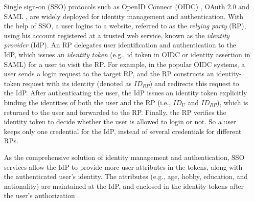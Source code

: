 Single sign-on (SSO) protocols such as OpenID Connect (OIDC) \cite{OpenIDConnect}, OAuth 2.0 \cite{rfc6749} and SAML \cite{SAML,SAMLIdentifier},
 are widely deployed for identity management and authentication.
 With the help of SSO,
  a user logins to a website, referred to as the \emph{relying party} (RP), using his account registered at a trusted web service,
   known as the \emph{identity provider} (IdP).
An RP delegates user identification and authentication to the IdP,
    which issues an \emph{identity token} (e.g., id token in OIDC or identity assertion in SAML) for a user to visit the RP. %
%
%
For example, in the popular OIDC systems,
     a user sends a login request to the target RP, %
and the RP constructs an identity-token request with its identity (denoted as $ID_{RP}$) and redirects this request to the IdP.
After authenticating the user,
 the IdP issues an identity token explicitly binding the identities of both the user and the RP (i.e., $ID_U$ and $ID_{RP}$),
    which is returned to the user and forwarded to the RP. %
Finally, the RP verifies the identity token to decide whether the user is allowed to login or not.
So a user keeps only one credential for the IdP, instead of several credentials for different RPs.

As the comprehensive solution of identity management and authentication,
    SSO services allow the IdP to provide more user attributes in the tokens,
        along with the authenticated user's identity.
The attributes (e.g., age, hobby, education, and nationality) are maintained at the IdP,
    and enclosed in the identity tokens after the user's authorization \cite{OpenIDConnect,rfc6749}.

